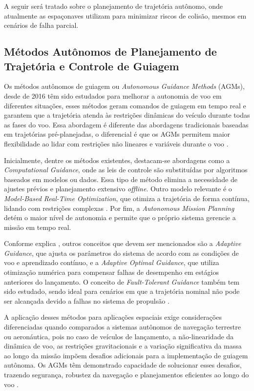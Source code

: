 A seguir será tratado sobre o planejamento de trajetória autônomo, onde atualmente as espaçonaves utilizam para minimizar riscos de colisão, mesmos em cenários de falha parcial.

\subsection{Métodos Autônomos de Planejamento de Trajetória e Controle de Guiagem}

Os métodos autônomos de guiagem ou \textit{Autonomous Guidance Methods}  (AGMs), desde de 2016 têm sido estudados para melhorar a autonomia de voo em diferentes situações, esses métodos geram comandos de guiagem em tempo real e garantem que a trajetória atenda às restrições dinâmicas do veículo durante todas as fases do voo. Essa abordagem é diferente das abordagens tradicionais baseadas em trajetórias pré-planejadas, o diferencial é que os AGMs permitem maior flexibilidade ao lidar com restrições não lineares e variáveis durante o voo \cite{song2023}.

Inicialmente, dentre os métodos existentes, destacam-se abordagens como a \textit{Computational Guidance}, onde as leis de controle são substituídas por algoritmos baseados em modelos ou dados. Essa tipo de método elimina a necessidade de ajustes prévios e planejamento extensivo \textit{offline}. Outro modelo relevante é o \textit{Model-Based Real-Time Optimization}, que otimiza a trajetória de forma contínua, lidando com restrições complexas \cite{song2023}. Por fim, a \textit{Autonomous Mission Planning} detém o maior nível de autonomia e permite que o próprio sistema gerencie a missão em tempo real.

Conforme explica \cite{song2023}, outros conceitos que devem ser mencionados são a \textit{Adaptive Guidance}, que ajusta os parâmetros do sistema de acordo com as condições de voo e aprendizado contínuo, e a \textit{Adaptive Optimal Guidance}, que utiliza otimização numérica para compensar falhas de desempenho em estágios anteriores do lançamento. O conceito de \textit{Fault-Tolerant Guidance} também tem sido estudado, sendo ideal para cenários em que a trajetória nominal não pode ser alcançada devido a falhas no sistema de propulsão \cite{song2023}.

A aplicação desses métodos para aplicações espaciais exige considerações diferenciadas quando comparados a sistemas autônomos de navegação terrestre ou aeronáutica, pois no caso de veículos de lançamento, a não-linearidade da dinâmica de voo, as restrições gravitacionais e a variação significativa da massa ao longo da missão impõem desafios adicionais para a implementação de guiagem autônoma. Os AGMs têm demonstrado capacidade de solucionar esses desafios, trazendo segurança, robustez da navegação e planejamentos eficientes ao longo do voo \cite{song2023}.
